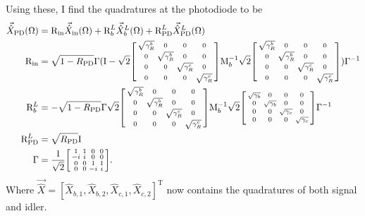 Using these, I find the quadratures at the photodiode to be
\begin{align}
\vec{\hat X}_\mathrm{PD}(\Omega)&=\text{R}_\text{in}\vec{\hat X}_\mathrm{in}(\Omega)+\text{R}^L_b\vec{\hat X}^L_b(\Omega)+\text{R}^L_\text{PD}\vec{\hat X}^L_\text{PD}(\Omega)\\
\text{R}_\text{in}&=\sqrt{1-R_\text{PD}}\Gamma(\text{I}-\sqrt 2\begin{bsmallmatrix}
\sqrt{\gamma^b_R} & 0 & 0 & 0 \\
0 & \sqrt{\gamma^b_R} & 0 & 0 \\
0 & 0 & \sqrt{\gamma^c_R} & 0 \\
0 & 0 & 0 & \sqrt{\gamma^c_R}
\end{bsmallmatrix}\text{M}_b^{-1}\sqrt{2}\begin{bsmallmatrix}
\sqrt{\gamma^b_R} & 0 & 0 & 0 \\
0 & \sqrt{\gamma^b_R} & 0 & 0 \\
0 & 0 & \sqrt{\gamma^c_R} & 0 \\
0 & 0 & 0 & \sqrt{\gamma^c_R}
\end{bsmallmatrix})\Gamma^{-1}\\
\text{R}^L_b&=-\sqrt{1-R_\text{PD}}\Gamma\sqrt 2\begin{bsmallmatrix}
\sqrt{\gamma^b_R} & 0 & 0 & 0 \\
0 & \sqrt{\gamma^b_R} & 0 & 0 \\
0 & 0 & \sqrt{\gamma^c_R} & 0 \\
0 & 0 & 0 & \sqrt{\gamma^c_R}
\end{bsmallmatrix}\text{M}_b^{-1}\sqrt{2}\begin{bsmallmatrix}
\sqrt{\gamma_b} & 0 & 0 & 0 \\
0 & \sqrt{\gamma_b} & 0 & 0 \\
0 & 0 & \sqrt{\gamma_c} & 0 \\
0 & 0 & 0 & \sqrt{\gamma_c}
\end{bsmallmatrix}\Gamma^{-1}\\
\text{R}^L_\text{PD}&=\sqrt{R_\text{PD}} \text{I}\\
\Gamma&= \frac{1}{\sqrt2}\begin{bsmallmatrix}
1 & 1 & 0 & 0 \\
-i & i & 0 & 0 \\
0 & 0 & 1 & 1 \\
0 & 0 & -i & i
\end{bsmallmatrix}.
\end{align}
Where $\vec{\hat X}=[\hat X_{b,1},\hat X_{b,2},\hat X_{c,1},\hat X_{c,2}]^\text{T}$ now contains the quadratures of both signal and idler.

